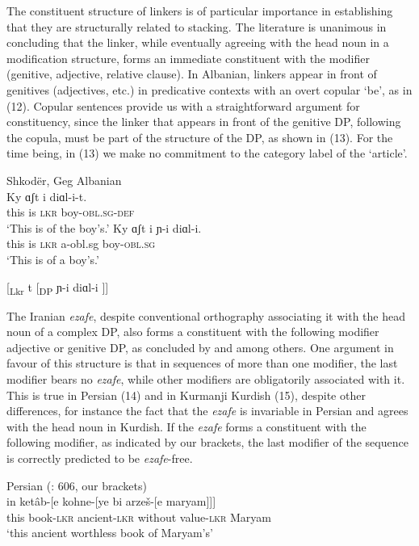 \documentclass[output=paper]{langsci/langscibook}
\begin{document}
 The constituent structure of linkers is of particular importance in establishing that they are structurally related to stacking. The literature is unanimous in concluding that the linker, while eventually agreeing with the head noun in a modification structure, forms an immediate constituent with the modifier (genitive, adjective, relative clause). In Albanian, linkers appear in front of genitives (adjectives, etc.) in predicative contexts with an overt copular ‘be’, as in (12). Copular sentences provide us with a straightforward argument for constituency, since the linker that appears in front of the genitive DP, following the copula, must be part of the structure of the DP, as shown in (13). For the time being, in (13) we make no commitment to the category label of the ‘article’.

\ea%
    Shkodër, Geg Albanian\label{ex:manzini:12}\\
    \ea
    \gll Ky   ɑʃt   i   diɑl-i-t.     \\
         this  is  \textsc{lkr}  boy-\textsc{obl.sg-def}   \\
    \glt ‘This is of the boy’s.’  
    \ex
    \gll Ky   ɑʃt   i  ɲ{}-i    diɑl-i.\\
         this  is  \textsc{lkr}  a-obl.sg   boy-\textsc{obl.sg}   \\
    \glt ‘This is of a boy’s.’
    \z
\z
          
\ea%
    \label{ex:manzini:13}
    [\textsubscript{Lkr} t  [\textsubscript{DP} ɲ-i diɑl-i ]]     
\z

The Iranian \textit{ezafe}, despite conventional orthography associating it with the head noun of a complex DP, also forms a constituent with the following modifier adjective or genitive DP, as concluded by \citet{Larson2008} and \citet{Philip2012} among others. One argument in favour of this structure is that in sequences of more than one modifier, the last modifier bears no \textit{ezafe}, while other modifiers are obligatorily associated with it. This is true in Persian (14) and in Kurmanji Kurdish (15), despite other differences, for instance the fact that the \textit{ezafe} is invariable in Persian and agrees with the head noun in Kurdish. If the \textit{ezafe} forms a constituent with the following modifier, as indicated by our brackets, the last modifier of the sequence is correctly predicted to be \textit{ezafe}{}-free. 

\ea%
         Persian (\citealt{Samvelian2007}: 606, our brackets)\label{ex:manzini:14}\\
    \gll in   ketâb-[e   kohne-[ye   bi arzeš-[e     maryam]]]\\
         this   book{}-\textsc{lkr}    ancient{}-\textsc{lkr}    without value{}-\textsc{lkr}    Maryam\\
    \glt ‘this ancient worthless book of Maryam’s’     
    \z
\end{document}
